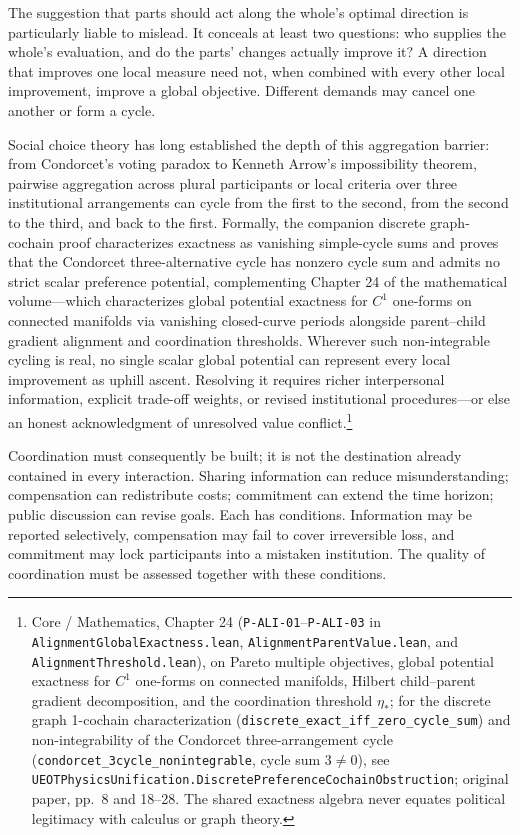 \documentclass[
  english,
  11pt,
  oneside]{book}
\begin{document}
The suggestion that parts should act along the whole's optimal direction is particularly liable to mislead. It conceals at least two questions: who supplies the whole's evaluation, and do the parts' changes actually improve it? A direction that improves one local measure need not, when combined with every other local improvement, improve a global objective. Different demands may cancel one another or form a cycle.

Social choice theory has long established the depth of this aggregation barrier: from Condorcet's voting paradox to Kenneth Arrow's impossibility theorem, pairwise aggregation across plural participants or local criteria over three institutional arrangements can cycle from the first to the second, from the second to the third, and back to the first. Formally, the companion discrete graph-cochain proof characterizes exactness as vanishing simple-cycle sums and proves that the Condorcet three-alternative cycle has nonzero cycle sum and admits no strict scalar preference potential, complementing Chapter 24 of the mathematical volume---which characterizes global potential exactness for \(C^1\) one-forms on connected manifolds via vanishing closed-curve periods alongside parent--child gradient alignment and coordination thresholds. Wherever such non-integrable cycling is real, no single scalar global potential can represent every local improvement as uphill ascent. Resolving it requires richer interpersonal information, explicit trade-off weights, or revised institutional procedures---or else an honest acknowledgment of unresolved value conflict.\footnote{\hypertarget{ph-note-44}{}Core / Mathematics, Chapter 24 (\texttt{P-ALI-01}--\texttt{P-ALI-03} in \nolinkurl{AlignmentGlobalExactness.lean}, \nolinkurl{AlignmentParentValue.lean}, and \texttt{AlignmentThreshold.lean}), on Pareto multiple objectives, global potential exactness for \(C^1\) one-forms on connected manifolds, Hilbert child--parent gradient decomposition, and the coordination threshold \(\eta_*\); for the discrete graph 1-cochain characterization (\nolinkurl{discrete_exact_iff_zero_cycle_sum}) and non-integrability of the Condorcet three-arrangement cycle (\nolinkurl{condorcet_3cycle_nonintegrable}, cycle sum \(3 \neq 0\)), see \nolinkurl{UEOTPhysicsUnification.DiscretePreferenceCochainObstruction}; original paper, pp.~8 and 18--28. The shared exactness algebra never equates political legitimacy with calculus or graph theory.}

Coordination must consequently be built; it is not the destination already contained in every interaction. Sharing information can reduce misunderstanding; compensation can redistribute costs; commitment can extend the time horizon; public discussion can revise goals. Each has conditions. Information may be reported selectively, compensation may fail to cover irreversible loss, and commitment may lock participants into a mistaken institution. The quality of coordination must be assessed together with these conditions.
\end{document}

